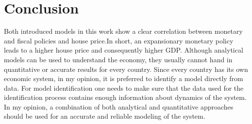 \section{Conclusion}
Both introduced models in this work show a clear correlation between monetary and fiscal policies and house price.In short, an expansionary monetary policy leads to a higher house price and consequently higher GDP. Although analytical models can be used to understand the economy, they usually cannot hand in quantitative or accurate results for every country. Since every country has its own economic system, in my opinion, it is preferred to identify a model directly from data. For model identification one needs to make sure that the data used for the identification process contains enough information about dynamics of the system. In my opinion, a combination of both analytical and quantitative approaches should be used for an accurate and reliable modeling of the system. 
